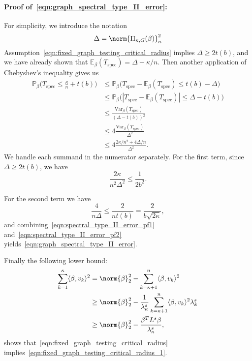 \documentclass{article}
\newcommand{\abs}[1]{\left \lvert #1 \right \rvert}
\newcommand{\Var}{\mathrm{Var}}
\newcommand{\1}{\mathbf{1}}
\newcommand{\Pbb}{\mathbb{P}}
\newcommand{\Ebb}{\mathbb{E}}
\newcommand{\dotp}[2]{\langle #1, #2 \rangle}
\newcommand{\spec}{\mathrm{spec}}
\theoremstyle{alden}
\theoremstyle{aldenthm}
\theoremstyle{definition}
\theoremstyle{remark}
\begin{document}
\paragraph{Proof of~\eqref{eqn:graph_spectral_type_II_error}:} For simplicity, we introduce the notation
\begin{equation*}
\Delta = \norm{\Pi_{\kappa,G}(\beta)}_n^2
\end{equation*}
Assumption~\eqref{eqn:fixed_graph_testing_critical_radius} implies $\Delta \geq 2 t(b)$, and we have already shown that $\Ebb_{\beta}(T_{\spec}) = \Delta + \kappa/n$. Then another application of Chebyshev's inequality gives us
\begin{align*}
\Pbb_{\beta}\bigl(T_{\spec} \leq \frac{\kappa}{n} + t(b)\bigr) & \leq \Pbb_{\beta}\bigl(T_{\spec} - \Ebb_{\beta}(T_{\spec}) \leq t(b) - \Delta \bigr) \\
& \leq \Pbb_{\beta}\bigl(\abs{T_{\spec} - \Ebb_{\beta}(T_{\spec})} \leq \Delta - t(b) \bigr) \tag{since $\Delta \geq t(b)$}	\\
& \leq \frac{\Var_{\beta}(T_{\spec})}{(\Delta - t(b))^2} \\
& \leq 4\frac{\Var_{\beta}(T_{\spec})}{\Delta^2} \tag{since $\Delta \geq 2t(b)$} \\
& \leq 4\frac{2\kappa/n^2 + 4\Delta/n}{\Delta^2}.
\end{align*}
We handle each summand in the numerator separately. For the first term, since $\Delta \geq 2 t(b)$, we have
\begin{equation}
\label{eqn:spectral_type_II_error_pf1}
\frac{2\kappa}{n^2\Delta^2} \leq \frac{1}{2b^2}.
\end{equation}

For the second term we have
\begin{equation}
\label{eqn:spectral_type_II_error_pf2}
\frac{4}{n\Delta} \leq \frac{2}{nt(b)} = \frac{2}{b\sqrt{2\kappa}}, 
\end{equation}
and combining~\eqref{eqn:spectral_type_II_error_pf1} and~\eqref{eqn:spectral_type_II_error_pf2} yields~\eqref{eqn:graph_spectral_type_II_error}.

Finally the following lower bound:
\begin{align*}
\sum_{k = 1}^{\kappa}\dotp{\beta}{v_k}^2 & = \norm{\beta}_2^2 - \sum_{k = \kappa + 1}^{n} \dotp{\beta}{v_k}^2 \\
& \geq \norm{\beta}_2^2 - \frac{1}{\lambda_{\kappa}^s}\sum_{k = \kappa + 1}^{n} \dotp{\beta}{v_k}^2 \lambda_k^s \\
& \geq \norm{\beta}_2^2 - \frac{\beta^T L^s \beta}{\lambda_{\kappa}^s},
\end{align*}
shows that~\eqref{eqn:fixed_graph_testing_critical_radius} implies~\eqref{eqn:fixed_graph_testing_critical_radius_1}.
\end{document}
